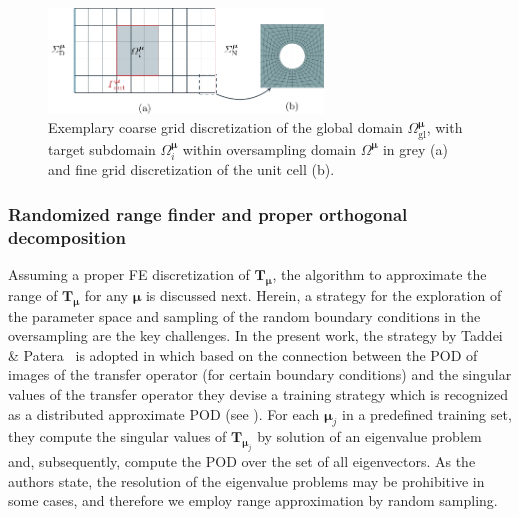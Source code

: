 \documentclass[a4paper]{eccomas_paper-2024}
\newcommand{\m}{\bm\mu}
\newcommand{\gl}{\mathrm{gl}}
\begin{document}
%    
\begin{figure}[h]
	\centering
	\includegraphics[width=0.65\textwidth]{oversampling_domain.pdf}
	\caption{Exemplary coarse grid discretization of the global domain $\varOmega^{\m}_{\gl}$, with target subdomain $\varOmega^{\m}_i$ within oversampling domain $\varOmega^{\m}$ in grey (a) and fine grid discretization of the unit cell (b).}%
	\label{fig:oversampling_domain}
\end{figure}


\subsubsection{Randomized range finder and proper orthogonal decomposition} %
\label{sec:Randomized range finder and POD}

Assuming a proper FE discretization of $\bm{T}_{\m}$, the algorithm to approximate the range of $\bm{T}_{\m}$ for any $\m$ is discussed next.
Herein, a strategy for the exploration of the parameter space and sampling of the random boundary conditions in the oversampling are the key challenges.
In the present work, the strategy by Taddei \& Patera~\cite{Taddei2018Localization} is adopted in which based on the connection between the POD of images of the transfer operator (for certain boundary conditions) and the singular values of the transfer operator they devise a training strategy which is recognized as a distributed approximate POD (see \cite{Himpe2018Hierarchical}).
For each $\m_j$ in a predefined training set, they compute the singular values of $\bm{T}_{\m_j}$ by solution of an eigenvalue problem and, subsequently, compute the POD over the set of all eigenvectors.
As the authors state, the resolution of the eigenvalue problems may be prohibitive in some cases, and therefore we employ range approximation by random sampling.
\end{document}

